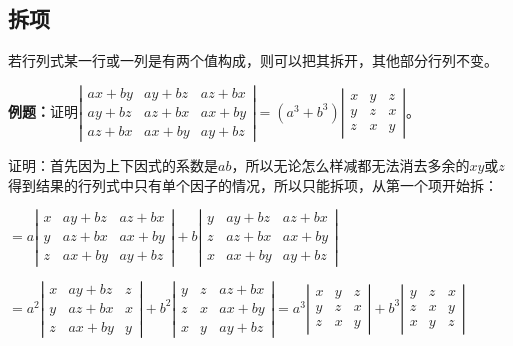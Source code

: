 \documentclass[UTF8, 12pt]{ctexart}
\begin{document}


\subsection{拆项}

若行列式某一行或一列是有两个值构成，则可以把其拆开，其他部分行列不变。

\textbf{例题：}证明$\left|\begin{array}{ccc}
    ax+by & ay+bz & az+bx \\
    ay+bz & az+bx & ax+by \\
    az+bx & ax+by & ay+bz
\end{array}\right|=(a^3+b^3)\left|\begin{array}{ccc}
    x & y & z \\
    y & z & x \\
    z & x & y
\end{array}\right|$。

证明：首先因为上下因式的系数是$ab$，所以无论怎么样减都无法消去多余的$xy$或$z$得到结果的行列式中只有单个因子的情况，所以只能拆项，从第一个项开始拆：

$=a\left|\begin{array}{ccc}
    x & ay+bz & az+bx \\
    y & az+bx & ax+by \\
    z & ax+by & ay+bz
\end{array}\right|+b\left|\begin{array}{ccc}
    y & ay+bz & az+bx \\
    z & az+bx & ax+by \\
    x & ax+by & ay+bz
\end{array}\right|$

$=a^2\left|\begin{array}{ccc}
    x & ay+bz & z \\
    y & az+bx & x \\
    z & ax+by & y
\end{array}\right|+b^2\left|\begin{array}{ccc}
    y & z & az+bx \\
    z & x & ax+by \\
    x & y & ay+bz
\end{array}\right|=a^3\left|\begin{array}{ccc}
    x & y & z \\
    y & z & x \\
    z & x & y
\end{array}\right|+b^3\left|\begin{array}{ccc}
    y & z & x \\
    z & x & y \\
    x & y & z
\end{array}\right|$
\end{document}
